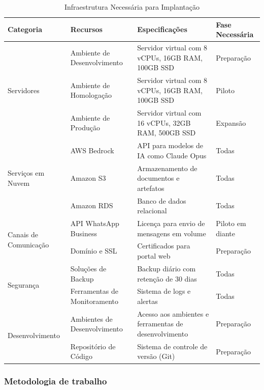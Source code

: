 \documentclass[12pt,a4paper]{article}
\renewcommand{\arraystretch}{1.2}
\begin{document}
\begin{table}[H]
\centering
\begin{adjustbox}{max width=\textwidth}
\renewcommand{\arraystretch}{1.2}
\begin{tabular}{|p{3cm}|p{5cm}|p{4cm}|p{3cm}|}
\hline
\rowcolor{gray!20}
\textbf{Categoria} & \textbf{Recursos} & \textbf{Especificações} & \textbf{Fase Necessária} \\
\hline
\multirow{3}{*}{Servidores} & Ambiente de Desenvolvimento & Servidor virtual com 8 vCPUs, 16GB RAM, 100GB SSD & Preparação \\
\cline{2-4}
 & Ambiente de Homologação & Servidor virtual com 8 vCPUs, 16GB RAM, 100GB SSD & Piloto \\
\cline{2-4}
 & Ambiente de Produção & Servidor virtual com 16 vCPUs, 32GB RAM, 500GB SSD & Expansão \\
\hline
\multirow{3}{*}{Serviços em Nuvem} & AWS Bedrock & API para modelos de IA como Claude Opus & Todas \\
\cline{2-4}
 & Amazon S3 & Armazenamento de documentos e artefatos & Todas \\
\cline{2-4}
 & Amazon RDS & Banco de dados relacional & Todas \\
\hline
\multirow{2}{*}{Canais de Comunicação} & API WhatsApp Business & Licença para envio de mensagens em volume & Piloto em diante \\
\cline{2-4}
 & Domínio e SSL & Certificados para portal web & Preparação \\
\hline
\multirow{2}{*}{Segurança} & Soluções de Backup & Backup diário com retenção de 30 dias & Todas \\
\cline{2-4}
 & Ferramentas de Monitoramento & Sistema de logs e alertas & Todas \\
\hline
\multirow{2}{*}{Desenvolvimento} & Ambientes de Desenvolvimento & Acesso aos ambientes e ferramentas de desenvolvimento & Preparação \\
\cline{2-4}
 & Repositório de Código & Sistema de controle de versão (Git) & Preparação \\
\hline
\end{tabular}
\end{adjustbox}
\caption{Infraestrutura Necessária para Implantação}
\end{table}

\subsubsection{Metodologia de trabalho}
\end{document}
